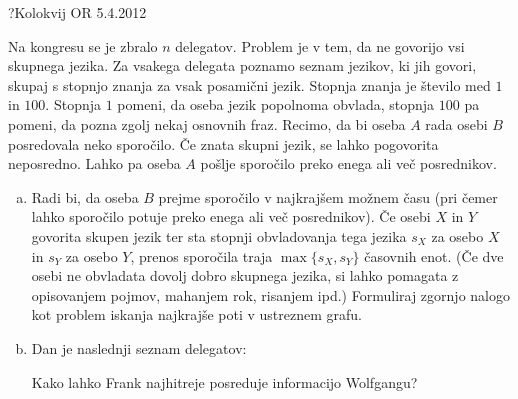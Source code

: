 \begin{naloga}{?}{Kolokvij OR 5.4.2012}
\begin{vprasanje}
Na kongresu se je zbralo $n$ delegatov.
Problem je v tem, da ne govorijo vsi skup\-ne\-ga jezika.
Za vsakega delegata poznamo seznam jezikov, ki jih govori,
skupaj s stopnjo znanja za vsak posamični jezik.
Stopnja znanja je število med $1$ in $100$.
Stopnja $1$ pomeni, da oseba jezik popolnoma obvlada,
stopnja $100$ pa pomeni, da pozna zgolj nekaj osnovnih fraz.
Recimo, da bi oseba $A$ rada osebi $B$ posredovala neko sporočilo.
Če znata skupni jezik, se lahko pogovorita neposredno.
Lahko pa oseba $A$ pošlje sporočilo preko enega ali več posrednikov.

\begin{enumerate}[(a)]
\item Radi bi, da oseba $B$ prejme sporočilo v najkrajšem možnem času
(pri čemer lahko sporočilo potuje preko enega ali več posrednikov).
Če osebi $X$ in $Y$ govorita skupen jezik
ter sta stopnji obvladovanja tega jezika
$s_X$ za osebo $X$ in $s_Y$ za osebo $Y$,
prenos sporočila traja $\max\{s_X, s_Y\}$ časovnih enot.
(Če dve osebi ne obvladata dovolj dobro skupnega jezika,
si lahko pomagata z opisovanjem pojmov, mahanjem rok, risanjem ipd.)
Formuliraj zgornjo nalogo
kot problem iskanja najkrajše poti v ustreznem grafu.

\item Dan je naslednji seznam delegatov:

\smallskip
{}

\bigskip
Kako lahko Frank najhitreje posreduje informacijo Wolfgangu?
\end{enumerate}
\end{vprasanje}
\begin{odgovor}
\end{odgovor}
\end{naloga}
